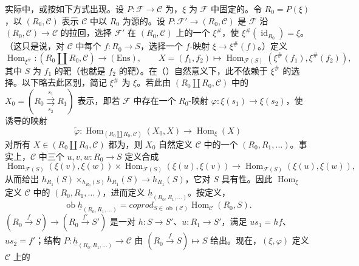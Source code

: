 实际中，或按如下方式出现。设 $P:\mathcal F\to\mathcal C$ 为，$\xi$ 为 $\mathcal F$ 中固定的。令 $R_0=P(\xi)$，以 $(R_0,\mathcal C)$ 表示 $\mathcal C$ 中以 $R_0$ 为源的。设 $P:\mathcal F'\to(R_0,\mathcal C)$ 是 $\mathcal F$ 沿 $(R_0,\mathcal C)\to\mathcal C$ 的拉回，选择 $\mathcal F'$ 在 $(R_0,\mathcal C)$ 上的一个 $\xi^\#$，使 $\xi^\#(\operatorname{id}_{R_0})=\xi$。（这只是说，对 $\mathcal C$ 中每个 $f:R_0\to S$，选择一个 $f$-映射 $\xi\to\xi^\#(f)$。）定义
\[\operatorname{Hom}_{\xi^\#}:(R_0\amalg R_0,\mathcal C)\longrightarrow(\mathrm{Ens}),\qquad
X=(f_1,f_2)\longmapsto\operatorname{Hom}_{\mathcal F(S)}(\xi^\#(f_1),\xi^\#(f_2)),\]
其中 $S$ 为 $f_1$ 的靶（也就是 $f_2$ 的靶）。在（）自然意义下，此不依赖于 $\xi^\#$ 的选择。以下略去此区别，简记 $\xi^\#$ 为 $\xi$。若此由 $(R_0\amalg R_0,\mathcal C)$ 中的
$X_0=(R_0\underset{s_2}{\overset{s_1}{\rightrightarrows}}R_1)$ 表示，即若 $\mathcal F$ 中存在一个 $R_0$-映射 $\varphi:\xi(s_1)\to\xi(s_2)$，使诱导的映射
\[\widetilde\varphi:\operatorname{Hom}_{(R_0\amalg R_0,\mathcal C)}(X_0,X)\longrightarrow\operatorname{Hom}_\xi(X)\]
对所有 $X\in(R_0\amalg R_0,\mathcal C)$ 都为，则 $X_0$ 自然定义 $\mathcal C$ 中的一个 $(R_0,R_1,\ldots)$。事实上，$\mathcal C$ 中三个
$u,v,w:R_0\to S$ 定义合成
\[\operatorname{Hom}_{\mathcal F(S)}(\xi(v),\xi(w))\times
\operatorname{Hom}_{\mathcal F(S)}(\xi(u),\xi(v))\longrightarrow
\operatorname{Hom}_{\mathcal F(S)}(\xi(u),\xi(w)),\]
从而给出 $h_{R_1}(S)\times_{h_{R_0}(S)}h_{R_1}(S)\to h_{R_1}(S)$，它对 $S$ 具有性。因此 $\operatorname{Hom}_\xi$ 定义 $\mathcal C$ 中的 $(R_0,R_1,\ldots)$，进而定义 $\underline h_{(R_0,R_1,\ldots)}$。按定义，
\[\operatorname{ob}\underline h_{(R_0,R_1,\ldots)}=coprod_{S\in\operatorname{ob}(\mathcal C)}\operatorname{Hom}_{\mathcal C}(R_0,S).\]
 $(R_0\xrightarrow fS)\to(R_0\xrightarrow{f'}S')$ 是一对 $h:S\to S'$、$u:R_1\to S'$，满足 $us_1=hf$、$us_2=f'$；结构 $P:\underline h_{(R_0,R_1,\ldots)}\to\mathcal C$ 由 $(R_0\xrightarrow fS)\mapsto S$ 给出。现在，$(\xi,\varphi)$ 定义 $\mathcal C$ 上的
